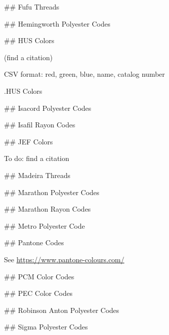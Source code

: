 ## Fufu Threads

%

%

## Hemingworth Polyester Codes

%

## HUS Colors

(find a citation)

CSV format: red, green, blue, name, catalog number

.HUS Colors

%

## Isacord Polyester Codes

%

## Isafil Rayon Codes

%

## JEF Colors

To do: find a citation

%

## Madeira Threads

%

%

## Marathon Polyester Codes

%

## Marathon Rayon Codes

%

## Metro Polyester Code

%

## Pantone Codes

See \url{https://www.pantone-colours.com/}

%

## PCM Color Codes

%

## PEC Color Codes

%

## Robinson Anton Polyester Codes


% 

## Sigma Polyester Codes

